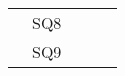 \documentclass[10pt,letterpaper,oneside]{article}
\begin{document}
\begin{table}[ht]
\begin{tabular}{|l|l|l|p{3cm}|p{5cm}|}
		& SQ8                                   &                                    &                                                         &                                                                                                                 \\ \cline{2-2}
		& SQ9                                   &                                    &                                                         &                                                                                                                 \\ \hline
	\end{tabular}
\end{table}
\end{document}
